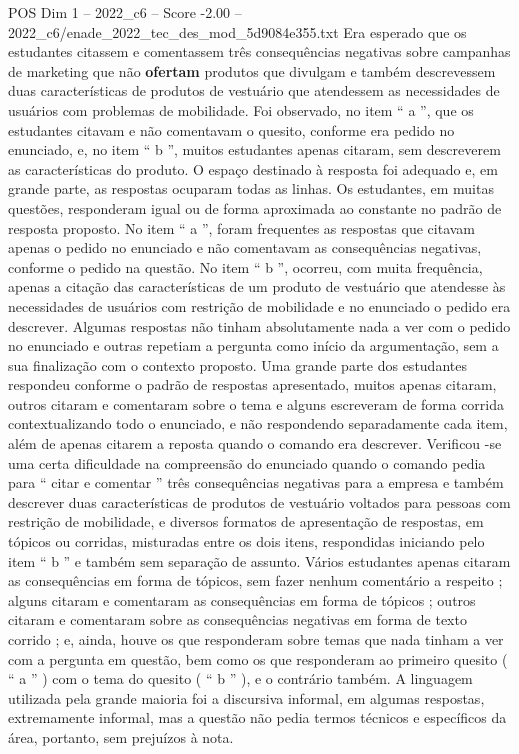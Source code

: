 \begin{textsample}{POS Dim 1 – 2022\_c6 – Score -2.00 – 2022\_c6/enade\_2022\_tec\_des\_mod\_5d9084e355.txt}
Era esperado que os estudantes citassem e comentassem três consequências negativas sobre campanhas de marketing que não \textbf{ofertam} produtos que divulgam e também descrevessem duas características de produtos de vestuário que atendessem as necessidades de usuários com problemas de mobilidade.
Foi observado, no item “ a ”, que os estudantes citavam e não comentavam o quesito, conforme era pedido no enunciado, e, no item “ b ”, muitos estudantes apenas citaram, sem descreverem as características do produto.
O espaço destinado à resposta foi adequado e, em grande parte, as respostas ocuparam todas as linhas.
Os estudantes, em muitas questões, responderam igual ou de forma aproximada ao constante no padrão de resposta proposto.
No item “ a ”, foram frequentes as respostas que citavam apenas o pedido no enunciado e não comentavam as consequências negativas, conforme o pedido na questão.
No item “ b ”, ocorreu, com muita frequência, apenas a citação das características de um produto de vestuário que atendesse às necessidades de usuários com restrição de mobilidade e no enunciado o pedido era descrever.
Algumas respostas não tinham absolutamente nada a ver com o pedido no enunciado e outras repetiam a pergunta como início da argumentação, sem a sua finalização com o contexto proposto.
Uma grande parte dos estudantes respondeu conforme o padrão de respostas apresentado, muitos apenas citaram, outros citaram e comentaram sobre o tema e alguns escreveram de forma corrida contextualizando todo o enunciado, e não respondendo separadamente cada item, além de apenas citarem a reposta quando o comando era descrever.
Verificou -se uma certa dificuldade na compreensão do enunciado quando o comando pedia para “ citar e comentar ” três consequências negativas para a empresa e também descrever duas características de produtos de vestuário voltados para pessoas com restrição de mobilidade, e diversos formatos de apresentação de respostas, em tópicos ou corridas, misturadas entre os dois itens, respondidas iniciando pelo item “ b ” e também sem separação de assunto.
Vários estudantes apenas citaram as consequências em forma de tópicos, sem fazer nenhum comentário a respeito ; alguns citaram e comentaram as consequências em forma de tópicos ; outros citaram e comentaram sobre as consequências negativas em forma de texto corrido ; e, ainda, houve os que responderam sobre temas que nada tinham a ver com a pergunta em questão, bem como os que responderam ao primeiro quesito ( “ a ” ) com o tema do quesito ( “ b ” ), e o contrário também.
A linguagem utilizada pela grande maioria foi a discursiva informal, em algumas respostas, extremamente informal, mas a questão não pedia termos técnicos e específicos da área, portanto, sem prejuízos à nota.

\end{textsample}
